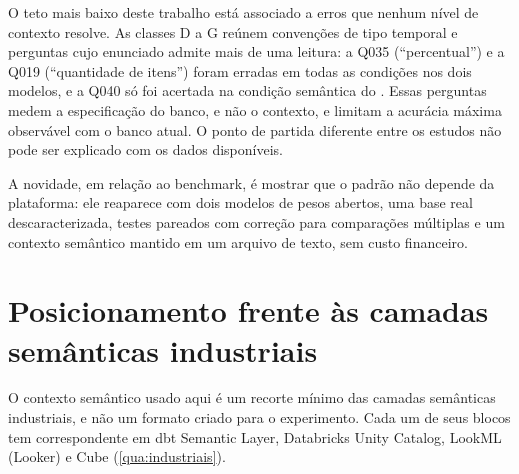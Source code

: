 O teto mais baixo deste trabalho está associado a erros que nenhum nível
de contexto resolve. As classes D a G reúnem convenções de tipo temporal e
perguntas cujo enunciado admite mais de uma leitura: a Q035
(``percentual'') e a Q019 (``quantidade de itens'') foram erradas em todas
as condições nos dois modelos, e a Q040 só foi acertada na condição
semântica do . Essas perguntas medem a especificação do
banco, e não o contexto, e limitam a acurácia máxima observável com o
banco atual. O ponto de partida diferente entre os estudos não pode ser
explicado com os dados disponíveis.

A novidade, em relação ao benchmark, é mostrar que o padrão não depende da
plataforma: ele reaparece com dois modelos de pesos abertos, uma base real
descaracterizada, testes pareados com correção para comparações
múltiplas e um contexto semântico mantido em um arquivo de texto, sem
custo financeiro.

\section{Posicionamento frente às camadas semânticas industriais}
\label{sec:industriais}

O contexto semântico usado aqui é um recorte mínimo das camadas semânticas
industriais, e não um formato criado para o experimento. Cada um de seus
blocos tem correspondente em dbt Semantic Layer, Databricks Unity Catalog,
LookML (Looker) e Cube (\autoref{qua:industriais}).


